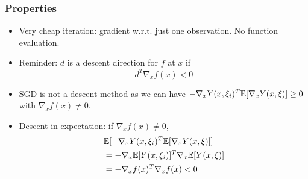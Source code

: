 \documentclass[usepdftitle=false, aspectratio=169]{beamer}
\begin{document}
\begin{frame}
\frametitle{Properties}

\begin{itemize}
\item 
Very cheap iteration: gradient w.r.t. just one observation. No function evaluation.
\item
Reminder: $d$ is a descent direction for $f$ at $x$ if
$$
d^T \nabla_x f(x) < 0
$$
\item
SGD is not a descent method as we can have $-\nabla_x Y(x,\xi_i)^T {\mathbb{E}}[\nabla_x Y(x,\xi)] \geq 0$ with $\nabla_x f(x) \ne 0$.
\item
Descent in expectation: if $\nabla_x f(x) \ne 0$,
\begin{align*}
& {\mathbb{E}}[-\nabla_x Y(x,\xi_i)^T {\mathbb{E}}[\nabla_x Y(x,\xi)]] \\
&= - \nabla_x {\mathbb{E}}[Y(x,\xi_i)]^T \nabla_x {\mathbb{E}}[Y(x,\xi)] \\
&= - \nabla_x f(x)^T\nabla_x f(x) < 0
\end{align*}
\end{itemize}



\end{frame}
\end{document}
